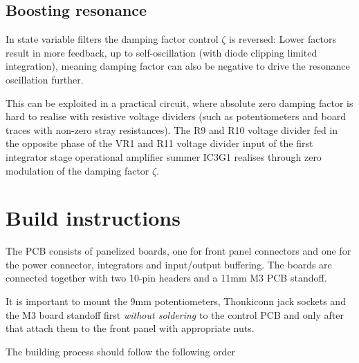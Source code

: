 \documentclass{article}
\begin{document}
\subsection{Boosting resonance}

In state variable filters the damping factor control $\zeta$ is reversed: Lower factors result in more feedback, up to self-oscillation (with diode clipping limited integration), meaning damping factor can also be negative to drive the resonance oscillation further.\newline

This can be exploited in a practical circuit, where absolute zero damping factor is hard to realise with resistive voltage dividers (such as potentiometers and board traces with non-zero stray resistances). The R9 and R10 voltage divider fed in the opposite phase of the VR1 and R11 voltage divider input of the first integrator stage operational amplifier summer IC3G1 realises through zero modulation of the damping factor $\zeta$.

\section{Build instructions} \label{buildinstructions}

The PCB consists of panelized boards, one for front panel connectors and one for the power connector, integrators and input/output buffering. The boards are connected together with two 10-pin headers and a 11mm M3 PCB standoff.\newline


It is important to mount the 9mm potentiometers, Thonkiconn jack sockets and the M3 board standoff first \emph{without soldering} to the control PCB and only after that attach them to the front panel with appropriate nuts. \newline


The building process should follow the following order
\end{document}
